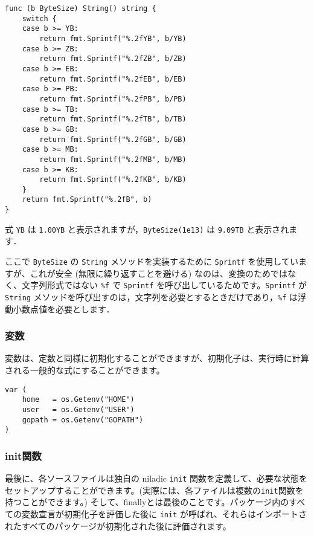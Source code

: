 \documentclass{jsarticle}
\begin{document}
\begin{lstlisting}[numbers=none]
func (b ByteSize) String() string {
    switch {
    case b >= YB:
        return fmt.Sprintf("%.2fYB", b/YB)
    case b >= ZB:
        return fmt.Sprintf("%.2fZB", b/ZB)
    case b >= EB:
        return fmt.Sprintf("%.2fEB", b/EB)
    case b >= PB:
        return fmt.Sprintf("%.2fPB", b/PB)
    case b >= TB:
        return fmt.Sprintf("%.2fTB", b/TB)
    case b >= GB:
        return fmt.Sprintf("%.2fGB", b/GB)
    case b >= MB:
        return fmt.Sprintf("%.2fMB", b/MB)
    case b >= KB:
        return fmt.Sprintf("%.2fKB", b/KB)
    }
    return fmt.Sprintf("%.2fB", b)
}
\end{lstlisting}

式 \texttt{YB} は \texttt{1.00YB}
と表示されますが，\texttt{ByteSize(1e13)} は \texttt{9.09TB}
と表示されます．

ここで \texttt{ByteSize} の \texttt{String} メソッドを実装するために
\texttt{Sprintf} を使用していますが、これが安全
(無限に繰り返すことを避ける)
なのは、変換のためではなく、文字列形式ではない \texttt{\%f} で
\texttt{Sprintf} を呼び出しているためです。\texttt{Sprintf} が
\texttt{String}
メソッドを呼び出すのは，文字列を必要とするときだけであり，\texttt{\%f}
は浮動小数点値を必要とします．

\subsubsection{変数}

変数は、定数と同様に初期化することができますが、初期化子は、実行時に計算される一般的な式にすることができます。

\begin{lstlisting}[numbers=none]
var (
    home   = os.Getenv("HOME")
    user   = os.Getenv("USER")
    gopath = os.Getenv("GOPATH")
)
\end{lstlisting}

\subsubsection{init関数}

最後に、各ソースファイルは独自の niladic \texttt{init}
関数を定義して、必要な状態をセットアップすることができます。(実際には、各ファイルは複数の\texttt{init}関数を持つことができます。)
そして、finallyとは最後のことです。パッケージ内のすべての変数宣言が初期化子を評価した後に
\texttt{init}
が呼ばれ、それらはインポートされたすべてのパッケージが初期化された後に評価されます。
\end{document}
